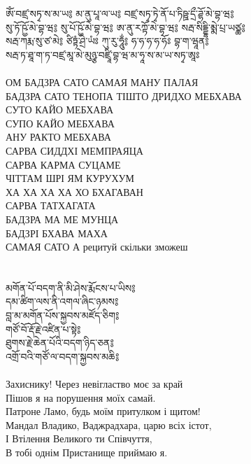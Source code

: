 \ru
\newpage
\ti
ཨོཾ་བཛྲ་སཏྭ་ས་མ་ཡ༔ མ་ནུ་པཱ་ལ་ཡ༔ བཛྲ་སཏྭ་ཏྭེ་ནོ་པ་ཏིཥྛ་དྲྀ་ཌྷོ་མེ་བྷ་ཝ༔ \\
སུ་ཏོ་ཥྱོ་མེ་བྷ་ཝ༔ སུ་པོ་ཥྱོ་མེ་བྷ་ཝ༔ ཨ་ནུ་རཀྟོ་མེ་བྷ་ཝ༔ སརྦ་སིདྡྷི་མྨེ་པྲ་ཡཙྪ༔ \\
སརྦ་ཀརྨ་སུ་ཙ་མེ༔ ཙིཏྟཾ་ཤྲེ་ཡཾཿ ཀུ་རུ་ཧཱུྂ༔ ཧ་ཧ་ཧ་ཧ་ཧོཿ བྷ་ག་ཝཱན༔ \\
སརྦ་ཏ་ཐཱ་ག་ཏ་བཛྲ་མཱ་མེ་མུཉྩ་བཛྲཱི་བྷ་ཝ་མ་ཧཱ་ས་མ་ཡ་སཏྭ་ཨཱཿ\\
\\
\ru
ОМ БАДЗРА САТО САМАЯ МАНУ ПАЛАЯ\\
БАДЗРА САТО ТЕНОПА ТІШТО ДРИДХО МЕБХАВА\\
СУТО КАЙО МЕБХАВА\\
СУПО КАЙО МЕБХАВА\\
АНУ РАКТО МЕБХАВА\\
САРВА СИДДХІ МЕМПРАЯЦА\\
САРВА КАРМА СУЦАМЕ\\
ЧІТТАМ ШРІ ЯМ КУРУХУМ\\
ХА ХА ХА ХА ХО БХАГАВАН\\
САРВА ТАТХАГАТА\\
БАДЗРА МА МЕ МУНЦА\\
БАДЗРІ БХАВА МАХА\\
САМАЯ САТО А \hspace{2cm} \scriptsize рецитуй скільки зможеш \normalsize \\
\\
\\
\ti
མགོན་པོ་བདག་ནི་མི་ཤེས་རྨོངས་པ་ཡིས༔\\
དམ་ཚིག་ལས་ནི་འགལ་ཞིང་ཉམས༔ \\
བླ་མ་མགོན་པོས་སྐྱབས་མཛོད་ཅིག༔ \\
གཙོ་བོ་རྡོ་རྗེ་འཛིན་པ་སྟེ༔ \\
ཐུགས་རྗེ་ཆེན་པོའི་བདག་ཉིད་ཅན༔ \\
འགྲོ་བའི་གཙོ་ལ་བདག་སྐྱབས་མཆི༔\\
\\
\ru
Захиснику! Через невігластво моє за край\\
Пішов я на порушення моїх самай.\\
Патроне Ламо, будь моїм притулком і щитом!\\
Мандал Владико, Ваджрадхара, царю всіх істот,\\
І Втілення Великого ти Співчуття,\\
В тобі однім Пристанище приймаю я.

